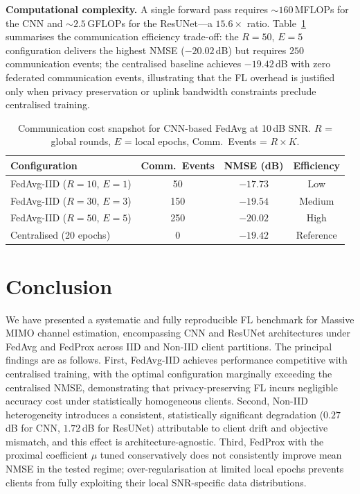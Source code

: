 \documentclass[runningheads]{llncs}
\begin{document}
\textbf{Computational complexity.}  A single forward pass requires
$\sim\!160$\,MFLOPs for the CNN and $\sim\!2.5$\,GFLOPs for the
ResUNet---a $15.6\times$ ratio.  Table~\ref{tab:comm} summarises the
communication efficiency trade-off: the $R\!=\!50$, $E\!=\!5$
configuration delivers the highest NMSE ($-20.02$\,dB) but requires
$250$ communication events; the centralised baseline achieves
$-19.42$\,dB with zero federated communication events, illustrating
that the FL overhead is justified only when privacy preservation or
uplink bandwidth constraints preclude centralised training.

\begin{table}[htbp]
\caption{Communication cost snapshot for CNN-based FedAvg at 10\,dB
  SNR.  $R$ = global rounds, $E$ = local epochs,
  Comm.\ Events = $R \times K$.}
\label{tab:comm}
\centering
\begin{tabular}{lccc}
\toprule
Configuration & Comm.\ Events & NMSE (dB) & Efficiency \\
\midrule
FedAvg-IID ($R\!=\!10$, $E\!=\!1$) &  50 & $-17.73$ & Low \\
FedAvg-IID ($R\!=\!30$, $E\!=\!3$) & 150 & $-19.54$ & Medium \\
FedAvg-IID ($R\!=\!50$, $E\!=\!5$) & 250 & $-20.02$ & High \\
Centralised (20 epochs)             &   0 & $-19.42$ & Reference \\
\bottomrule
\end{tabular}
\end{table}

\section{Conclusion}
\label{sec:conclusion}

We have presented a systematic and fully reproducible FL benchmark for
Massive MIMO channel estimation, encompassing CNN and ResUNet
architectures under FedAvg and FedProx across IID and Non-IID client
partitions.  The principal findings are as follows.  First, FedAvg-IID
achieves performance competitive with centralised training, with the
optimal configuration marginally exceeding the centralised NMSE,
demonstrating that privacy-preserving FL incurs negligible accuracy
cost under statistically homogeneous clients.  Second, Non-IID
heterogeneity introduces a consistent, statistically significant
degradation ($0.27$\,dB for CNN, $1.72$\,dB for ResUNet) attributable
to client drift and objective mismatch, and this effect is
architecture-agnostic.  Third, FedProx with the proximal coefficient
$\mu$ tuned conservatively does not consistently improve mean NMSE in
the tested regime; over-regularisation at limited local epochs prevents
clients from fully exploiting their local SNR-specific data
distributions.
\end{document}
